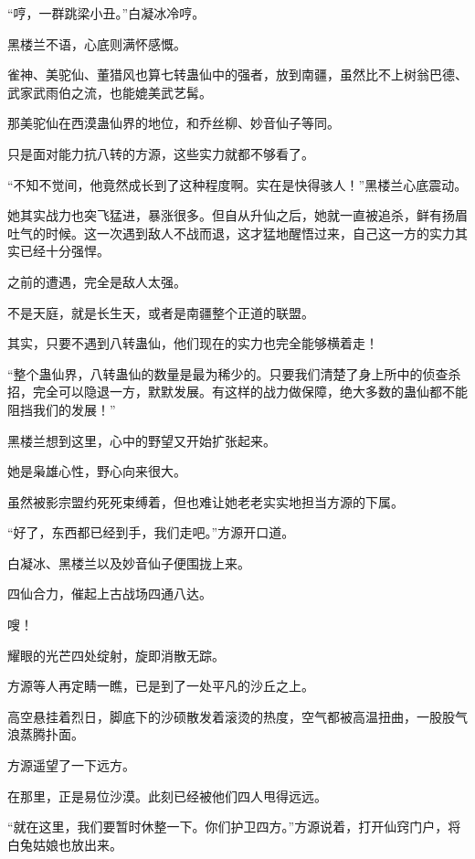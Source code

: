 
\begin{this_body}



“哼，一群跳梁小丑。”白凝冰冷哼。

黑楼兰不语，心底则满怀感慨。

雀神、美驼仙、董猎风也算七转蛊仙中的强者，放到南疆，虽然比不上树翁巴德、武家武雨伯之流，也能媲美武艺髯。

那美驼仙在西漠蛊仙界的地位，和乔丝柳、妙音仙子等同。

只是面对能力抗八转的方源，这些实力就都不够看了。

“不知不觉间，他竟然成长到了这种程度啊。实在是快得骇人！”黑楼兰心底震动。

她其实战力也突飞猛进，暴涨很多。但自从升仙之后，她就一直被追杀，鲜有扬眉吐气的时候。这一次遇到敌人不战而退，这才猛地醒悟过来，自己这一方的实力其实已经十分强悍。

之前的遭遇，完全是敌人太强。

不是天庭，就是长生天，或者是南疆整个正道的联盟。

其实，只要不遇到八转蛊仙，他们现在的实力也完全能够横着走！

“整个蛊仙界，八转蛊仙的数量是最为稀少的。只要我们清楚了身上所中的侦查杀招，完全可以隐退一方，默默发展。有这样的战力做保障，绝大多数的蛊仙都不能阻挡我们的发展！”

黑楼兰想到这里，心中的野望又开始扩张起来。

她是枭雄心性，野心向来很大。

虽然被影宗盟约死死束缚着，但也难让她老老实实地担当方源的下属。

“好了，东西都已经到手，我们走吧。”方源开口道。

白凝冰、黑楼兰以及妙音仙子便围拢上来。

四仙合力，催起上古战场四通八达。

嗖！

耀眼的光芒四处绽射，旋即消散无踪。

方源等人再定睛一瞧，已是到了一处平凡的沙丘之上。

高空悬挂着烈日，脚底下的沙硕散发着滚烫的热度，空气都被高温扭曲，一股股气浪蒸腾扑面。

方源遥望了一下远方。

在那里，正是易位沙漠。此刻已经被他们四人甩得远远。

“就在这里，我们要暂时休整一下。你们护卫四方。”方源说着，打开仙窍门户，将白兔姑娘也放出来。


\end{this_body}
